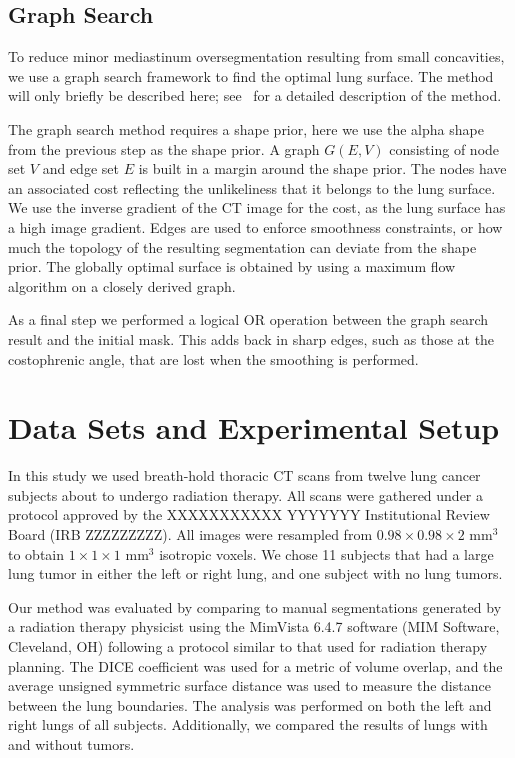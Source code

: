 \documentclass{llncs}
\begin{document}
\subsection{Graph Search}
%
To reduce minor mediastinum oversegmentation resulting from small concavities, we use a graph search framework to find the optimal lung surface. The method will only briefly be described here; see~\cite{li2006} for a detailed description of the method. 

The graph search method requires a shape prior, here we use the alpha shape from the previous step as the shape prior. A graph $G(E,V)$ consisting of node set $V$ and edge set $E$ is built in a margin around the shape prior. The nodes have an associated cost reflecting the unlikeliness that it belongs to the lung surface. We use the inverse gradient of the CT image for the cost, as the lung surface has a high image gradient. Edges are used to enforce smoothness constraints, or how much the topology of the resulting segmentation can deviate from the shape prior. The globally optimal surface is obtained by using a maximum flow algorithm on a closely derived graph. 

As a final step we performed a logical OR operation between the graph search result and the initial mask. This adds back in sharp edges, such as those at the costophrenic angle, that are lost when the smoothing is performed.
 

%
\section{Data Sets and Experimental Setup}
%
In this study we used breath-hold thoracic CT scans from twelve lung cancer subjects about to undergo radiation therapy. All scans were gathered under a protocol approved by the 
XXXXXXXXXXX YYYYYYY 
Institutional Review Board 
(IRB ZZZZZZZZZ).
All images were resampled from $0.98\times{}0.98\times{}2$ mm$^3$ to obtain $1\times{}1\times{}1$ mm$^3$ isotropic voxels. We chose 11 subjects that had a large lung tumor in either the left or right lung, and one subject with no lung tumors.

Our method was evaluated by comparing to manual segmentations generated by a radiation therapy physicist using the MimVista 6.4.7 software (MIM Software, Cleveland, OH) following a protocol similar to that used for radiation therapy planning. The DICE coefficient was used for a metric of volume overlap, and the average unsigned symmetric surface distance was used to measure the distance between the lung boundaries. The analysis was performed on both the left and right lungs of all subjects. Additionally, we compared the results of lungs with and without tumors.
\end{document}
